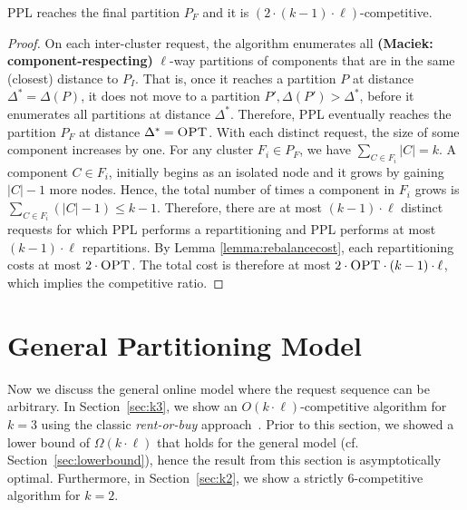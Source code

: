 \documentclass[a4paper,anonymous,USenglish]{lipics-v2019}
\newcommand{\OPT}{\textsc{OPT}\xspace}
\newcommand{\PPL}{\textsc{PPL}\xspace}
\newcommand{\OBRP}{BRP\xspace}
\newcommand\maciek[1]{\color{brown}\textbf{(Maciek: #1)}\color{black}}
\begin{document}
\begin{theorem}	\label{thm:upperbound}
	\PPL reaches the final partition $P_F$
	 and it is $(2\cdot (k-1)\cdot\ell)$-competitive.
\end{theorem}
\begin{proof}
	On each inter-cluster request,
	the algorithm enumerates all \maciek{component-respecting} $\ell$-way partitions of components
	that are in the same (closest) distance to $P_I$.
	That is, 
	once it reaches a partition $P$ at distance $\Delta^* = \Delta(P)$,
	it does not move to a partition
	$P', \Delta(P') > \Delta^*$,
	before it enumerates all partitions at distance $\Delta^*$.
	Therefore,
	\PPL eventually reaches  the partition $P_F$ at distance $\Delta^*=\OPT$.
	With each distinct request, 
	the size of some component increases by one.
	For any cluster $F_i \in P_F$,
	we have $\sum_{C \in F_i} |C| = k$.
	A component $C \in F_i$,
	 initially begins as an isolated node and it grows by gaining $|C|-1$ more nodes.
	Hence, the total number of times a component in $F_i$ grows is 
	$\sum_{C \in F_i} (|C|-1) \leq k-1$.
	Therefore, there are at most  $(k-1)\cdot\ell $ distinct requests
	for which \PPL performs a repartitioning and
	 \PPL performs at most $(k-1)\cdot\ell $ repartitions.
	By Lemma \ref{lemma:rebalancecost},
	each repartitioning costs at most $2\cdot\OPT$.
	The total cost is therefore at most $2\cdot\OPT\cdot (k-1) \cdot\ell$, which implies the competitive ratio.
\end{proof}


\section{General Partitioning Model}
\label{sec:part}

Now  we discuss the general online
model where the request sequence
can be arbitrary.
In Section~\ref{sec:k3}, we show an $O(k \cdot \ell)$-competitive algorithm for $k=3$ using the classic \emph{rent-or-buy} approach~\cite{karlin-ski-rental}.
Prior to this section, we showed a lower bound of $\Omega(k \cdot \ell)$  that holds for the general model (cf. Section~\ref{sec:lowerbound}), hence the result from this section is asymptotically optimal.
Furthermore, in Section~\ref{sec:k2}, we show a strictly $6$-competitive algorithm for $k=2$.
\end{document}
